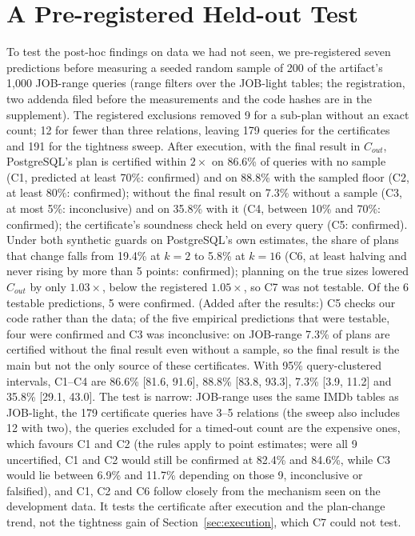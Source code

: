 \documentclass[sigconf, nonacm]{acmart}
\begin{document}
\section{A Pre-registered Held-out Test}
\label{sec:heldout}
To test the post-hoc findings on data we had not seen, we pre-registered seven predictions before measuring a seeded random sample of 200 of the artifact's 1{,}000 JOB-range queries (range filters over the JOB-light tables; the registration, two addenda filed before the measurements and the code hashes are in the supplement). The registered exclusions removed 9 for a sub-plan without an exact count; 12 for fewer than three relations, leaving 179 queries for the certificates and 191 for the tightness sweep. After execution, with the final result in $C_{out}$, PostgreSQL's plan is certified within $2\times$ on 86.6\% of queries with no sample (C1, predicted at least 70\%: confirmed) and on 88.8\% with the sampled floor (C2, at least 80\%: confirmed); without the final result on 7.3\% without a sample (C3, at most 5\%: inconclusive) and on 35.8\% with it (C4, between 10\% and 70\%: confirmed); the certificate's soundness check held on every query (C5: confirmed). Under both synthetic guards on PostgreSQL's own estimates, the share of plans that change falls from 19.4\% at $k=2$ to 5.8\% at $k=16$ (C6, at least halving and never rising by more than 5 points: confirmed); planning on the true sizes lowered $C_{out}$ by only $1.03\times$, below the registered $1.05\times$, so C7 was not testable. Of the 6 testable predictions, 5 were confirmed. (Added after the results:) C5 checks our code rather than the data; of the five empirical predictions that were testable, four were confirmed and C3 was inconclusive: on JOB-range 7.3\% of plans are certified without the final result even without a sample, so the final result is the main but not the only source of these certificates. With 95\% query-clustered intervals, C1--C4 are 86.6\% [81.6, 91.6],
88.8\% [83.8, 93.3], 7.3\% [3.9, 11.2] and 35.8\% [29.1, 43.0]. The test is
narrow: JOB-range uses the same IMDb tables as JOB-light, the 179 certificate
queries have 3--5 relations (the sweep also includes 12 with two), the queries excluded for a timed-out count are the
expensive ones, which favours C1 and C2 (the rules apply to point estimates;
were all 9 uncertified, C1 and C2 would still be confirmed at 82.4\% and
84.6\%, while C3 would lie between 6.9\% and 11.7\% depending on those 9,
inconclusive or falsified), and C1, C2 and C6 follow closely from
the mechanism seen on the development data. It tests the certificate after
execution and the plan-change trend, not the tightness gain of
Section~\ref{sec:execution}, which C7 could not test.
\end{document}
